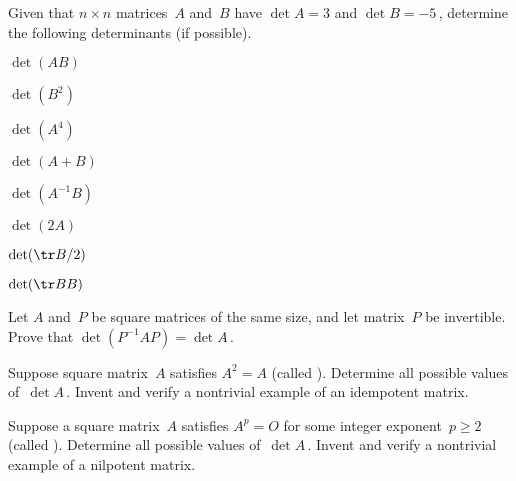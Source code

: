 \begin{exercise}  
Given that \(n\times n\) matrices~\(A\) and~\(B\) have \(\det A=3\) and \(\det B=-5\)\,, determine the following determinants (if possible).
\begin{Parts}
\item \(\det(AB)\)

\item \(\det(B^2)\)

\item \(\det(A^4)\)

\item \(\det(A+B)\)

\item \(\det(A^{-1}B)\)

\item \(\det(2A)\)

\begin{reduce}
\item \(\det(\tr B/2)\)

\item \(\det(\tr BB)\)
\end{reduce}

\end{Parts}
\end{exercise}






\begin{exercise}  
Let \(A\) and~\(P\) be square matrices of the same size, and let matrix~\(P\) be invertible.  Prove that \(\det(P^{-1}AP)=\det A\)\,.
\end{exercise}





\begin{exercise}  
Suppose square matrix~\(A\) satisfies \(A^2=A\) (called ).  Determine all possible values of~\(\det A\)\,.
Invent and verify a nontrivial example of an idempotent matrix.
\end{exercise}



\begin{exercise}  
Suppose a square matrix~\(A\) satisfies \(A^p=O\) for some integer exponent~\(p\geq 2\) (called ). 
Determine all possible values of~\(\det A\)\,.
Invent and verify a nontrivial example of a nilpotent matrix. 
\end{exercise}






